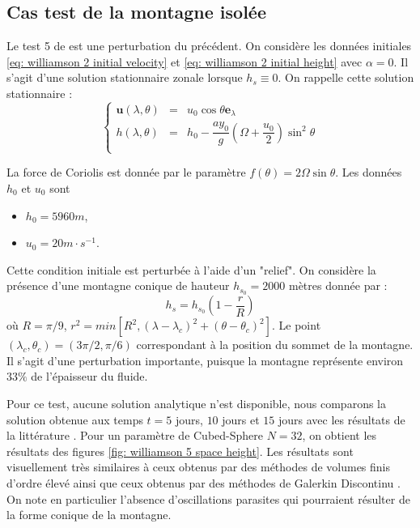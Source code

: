 \subsection{Cas test de la montagne isolée}

Le test 5 de \cite{Williamson1992} est une perturbation du précédent.
On considère les données initiales \eqref{eq: williamson 2 initial velocity} et \eqref{eq: williamson 2 initial height} avec $\alpha = 0$. Il s'agit d'une solution stationnaire zonale lorsque $h_s \equiv 0$. On rappelle cette solution stationnaire :
\begin{equation}
\left\lbrace
\begin{array}{rcl}
\mathbf{u}(\lambda, \theta) & = & u_0 \cos \theta \mathbf{e}_{\lambda} \\
h(\lambda, \theta) & = & h_0 - \dfrac{a y_0}{g} \left( \Omega  + \dfrac{u_0}{2} \right) \sin^2 \theta \\
\end{array}
\right.
\end{equation}

La force de Coriolis est donnée par le paramètre $f(\theta) = 2 \Omega \sin \theta$. Les données $h_0$ et $u_0$ sont
\begin{itemize}
\item $h_0 = 5960 \si{m}$,
\item $u_0 = 20 \si{m} \cdot \si{s^{-1}}$.
\end{itemize}
Cette condition initiale est perturbée à l'aide d'un "relief".
On considère la présence d'une montagne conique de hauteur $h_{s_0} = 2000$ mètres donnée par :
\begin{equation}
h_s = h_{s_0} \left( 1 - \dfrac{r}{R} \right)
\end{equation}
où $R= \pi / 9$, $r^2 = min \left[ R^2, \left( \lambda - \lambda_c \right)^2 + \left( \theta - \theta_c \right)^2 \right]$. Le point $(\lambda_c, \theta_c)= (3 \pi / 2, \pi / 6)$ correspondant à la position du sommet de la montagne.
Il s'agit d'une perturbation importante, puisque la montagne représente environ $33 \%$ de l'épaisseur du fluide.

Pour ce test, aucune solution analytique n'est disponible, nous comparons la solution obtenue aux temps $t=5$ jours, $10$ jours et $15$ jours avec les résultats de la littérature \cite{Ullrich2011, Kuang2016}. Pour un paramètre de Cubed-Sphere $N=32$, on obtient les résultats des figures \ref{fig: williamson 5 space height}. Les résultats sont visuellement très similaires à ceux obtenus par des méthodes de volumes finis \cite{Katta2015, Chen2008} d'ordre élevé ainsi que ceux obtenus par des méthodes de Galerkin Discontinu \cite{Nair2005}. On note en particulier l'absence d'oscillations parasites qui pourraient résulter de la forme conique de la montagne.

